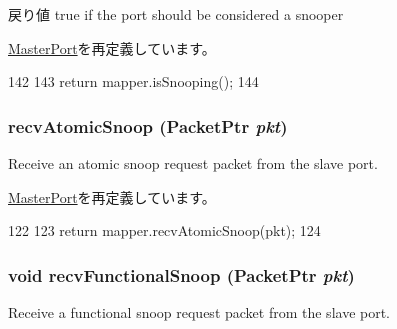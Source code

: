 \begin{DoxyReturn}{戻り値}
true if the port should be considered a snooper 
\end{DoxyReturn}


\hyperlink{classMasterPort_a32602a6a3c3d66a639455036d6c08dd6}{MasterPort}を再定義しています。


\begin{DoxyCode}
142         {
143             return mapper.isSnooping();
144         }
\end{DoxyCode}
\hypertarget{classAddrMapper_1_1MapperMasterPort_a886d584c81ee4e398ff8069907f6e1a5}{
\subsubsection[{recvAtomicSnoop}]{ recvAtomicSnoop ({\bf PacketPtr} {\em pkt})}}
\label{classAddrMapper_1_1MapperMasterPort_a886d584c81ee4e398ff8069907f6e1a5}
Receive an atomic snoop request packet from the slave port. 

\hyperlink{classMasterPort_ae1160d8f94f042aba1dc9a07a72e1e82}{MasterPort}を再定義しています。


\begin{DoxyCode}
122         {
123             return mapper.recvAtomicSnoop(pkt);
124         }
\end{DoxyCode}
\hypertarget{classAddrMapper_1_1MapperMasterPort_a284dfb90c168233c9d416bc07de8fefe}{
\subsubsection[{recvFunctionalSnoop}]{\setlength{\rightskip}{0pt plus 5cm}void recvFunctionalSnoop ({\bf PacketPtr} {\em pkt})}}
\label{classAddrMapper_1_1MapperMasterPort_a284dfb90c168233c9d416bc07de8fefe}
Receive a functional snoop request packet from the slave port. 

